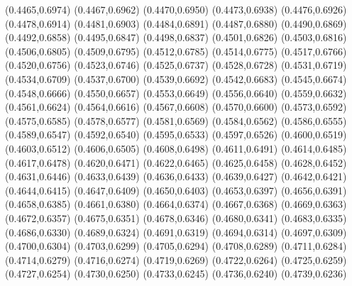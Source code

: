 \PST@Cross(0.4465,0.6974)
\PST@Cross(0.4467,0.6962)
\PST@Cross(0.4470,0.6950)
\PST@Cross(0.4473,0.6938)
\PST@Cross(0.4476,0.6926)
\PST@Cross(0.4478,0.6914)
\PST@Cross(0.4481,0.6903)
\PST@Cross(0.4484,0.6891)
\PST@Cross(0.4487,0.6880)
\PST@Cross(0.4490,0.6869)
\PST@Cross(0.4492,0.6858)
\PST@Cross(0.4495,0.6847)
\PST@Cross(0.4498,0.6837)
\PST@Cross(0.4501,0.6826)
\PST@Cross(0.4503,0.6816)
\PST@Cross(0.4506,0.6805)
\PST@Cross(0.4509,0.6795)
\PST@Cross(0.4512,0.6785)
\PST@Cross(0.4514,0.6775)
\PST@Cross(0.4517,0.6766)
\PST@Cross(0.4520,0.6756)
\PST@Cross(0.4523,0.6746)
\PST@Cross(0.4525,0.6737)
\PST@Cross(0.4528,0.6728)
\PST@Cross(0.4531,0.6719)
\PST@Cross(0.4534,0.6709)
\PST@Cross(0.4537,0.6700)
\PST@Cross(0.4539,0.6692)
\PST@Cross(0.4542,0.6683)
\PST@Cross(0.4545,0.6674)
\PST@Cross(0.4548,0.6666)
\PST@Cross(0.4550,0.6657)
\PST@Cross(0.4553,0.6649)
\PST@Cross(0.4556,0.6640)
\PST@Cross(0.4559,0.6632)
\PST@Cross(0.4561,0.6624)
\PST@Cross(0.4564,0.6616)
\PST@Cross(0.4567,0.6608)
\PST@Cross(0.4570,0.6600)
\PST@Cross(0.4573,0.6592)
\PST@Cross(0.4575,0.6585)
\PST@Cross(0.4578,0.6577)
\PST@Cross(0.4581,0.6569)
\PST@Cross(0.4584,0.6562)
\PST@Cross(0.4586,0.6555)
\PST@Cross(0.4589,0.6547)
\PST@Cross(0.4592,0.6540)
\PST@Cross(0.4595,0.6533)
\PST@Cross(0.4597,0.6526)
\PST@Cross(0.4600,0.6519)
\PST@Cross(0.4603,0.6512)
\PST@Cross(0.4606,0.6505)
\PST@Cross(0.4608,0.6498)
\PST@Cross(0.4611,0.6491)
\PST@Cross(0.4614,0.6485)
\PST@Cross(0.4617,0.6478)
\PST@Cross(0.4620,0.6471)
\PST@Cross(0.4622,0.6465)
\PST@Cross(0.4625,0.6458)
\PST@Cross(0.4628,0.6452)
\PST@Cross(0.4631,0.6446)
\PST@Cross(0.4633,0.6439)
\PST@Cross(0.4636,0.6433)
\PST@Cross(0.4639,0.6427)
\PST@Cross(0.4642,0.6421)
\PST@Cross(0.4644,0.6415)
\PST@Cross(0.4647,0.6409)
\PST@Cross(0.4650,0.6403)
\PST@Cross(0.4653,0.6397)
\PST@Cross(0.4656,0.6391)
\PST@Cross(0.4658,0.6385)
\PST@Cross(0.4661,0.6380)
\PST@Cross(0.4664,0.6374)
\PST@Cross(0.4667,0.6368)
\PST@Cross(0.4669,0.6363)
\PST@Cross(0.4672,0.6357)
\PST@Cross(0.4675,0.6351)
\PST@Cross(0.4678,0.6346)
\PST@Cross(0.4680,0.6341)
\PST@Cross(0.4683,0.6335)
\PST@Cross(0.4686,0.6330)
\PST@Cross(0.4689,0.6324)
\PST@Cross(0.4691,0.6319)
\PST@Cross(0.4694,0.6314)
\PST@Cross(0.4697,0.6309)
\PST@Cross(0.4700,0.6304)
\PST@Cross(0.4703,0.6299)
\PST@Cross(0.4705,0.6294)
\PST@Cross(0.4708,0.6289)
\PST@Cross(0.4711,0.6284)
\PST@Cross(0.4714,0.6279)
\PST@Cross(0.4716,0.6274)
\PST@Cross(0.4719,0.6269)
\PST@Cross(0.4722,0.6264)
\PST@Cross(0.4725,0.6259)
\PST@Cross(0.4727,0.6254)
\PST@Cross(0.4730,0.6250)
\PST@Cross(0.4733,0.6245)
\PST@Cross(0.4736,0.6240)
\PST@Cross(0.4739,0.6236)
